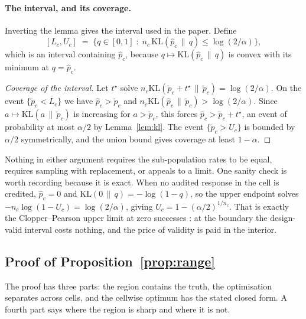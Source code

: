 \paragraph{The interval, and its coverage.}
Inverting the lemma gives the interval used in the paper. Define
\[
[L_c, U_c] \;=\; \bigl\{ q \in [0,1] \;:\; n_c\,\mathrm{KL}(\hat p_c \,\|\, q) \le \log(2/\alpha) \bigr\} ,
\]
which is an interval containing $\hat p_c$, because $q \mapsto \mathrm{KL}(\hat p_c \,\|\, q)$
is convex with its minimum at $q = \hat p_c$.

\begin{proof}[Coverage of the interval]
Let $t^{\star}$ solve $n_c \mathrm{KL}(\tilde p_c + t^{\star} \,\|\, \tilde p_c) = \log(2/\alpha)$.
On the event $\{\tilde p_c < L_c\}$ we have $\hat p_c > \tilde p_c$ and
$n_c \mathrm{KL}(\hat p_c \,\|\, \tilde p_c) > \log(2/\alpha)$. Since
$a \mapsto \mathrm{KL}(a \,\|\, \tilde p_c)$ is increasing for $a > \tilde p_c$, this forces
$\hat p_c > \tilde p_c + t^{\star}$, an event of probability at most $\alpha/2$ by
Lemma~\ref{lem:kl}. The event $\{\tilde p_c > U_c\}$ is bounded by $\alpha/2$ symmetrically,
and the union bound gives coverage at least $1 - \alpha$.
\end{proof}

Nothing in either argument requires the sub-population rates to be equal, requires sampling
with replacement, or appeals to a limit. One sanity check is worth recording because it is
exact. When no audited response in the cell is credited, $\hat p_c = 0$ and
$\mathrm{KL}(0 \,\|\, q) = -\log(1-q)$, so the upper endpoint solves
$-n_c\log(1 - U_c) = \log(2/\alpha)$, giving $U_c = 1 - (\alpha/2)^{1/n_c}$. That is exactly
the Clopper--Pearson upper limit at zero successes \citep{clopper1934use}: at the boundary the
design-valid interval costs nothing, and the price of validity is paid in the interior.

\subsection{Proof of Proposition~\ref{prop:range}}

The proof has three parts: the region contains the truth, the optimisation separates across
cells, and the cellwise optimum has the stated closed form. A fourth part says where the
region is sharp and where it is not.

